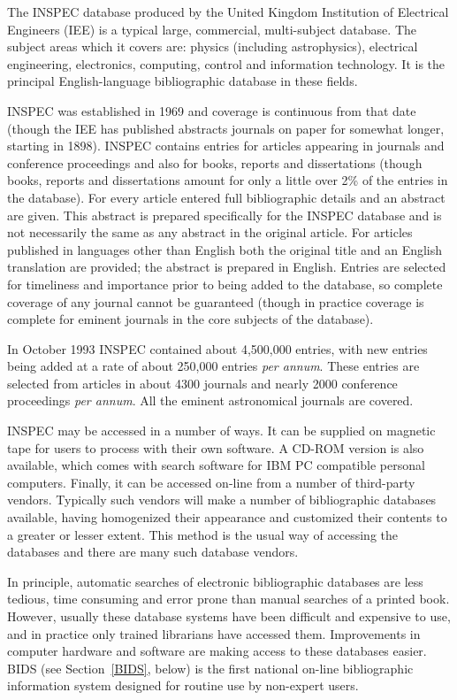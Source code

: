 \documentclass[twoside,11pt,nolof]{starlink}
\begin{document}
The INSPEC database produced by the United Kingdom Institution of
Electrical Engineers (IEE) is  a typical large, commercial,
multi-subject database. The subject areas which it covers are: physics
(including astrophysics), electrical engineering, electronics,
computing, control and information technology. It is the principal
English-language bibliographic database in these fields.

INSPEC was established in 1969 and coverage is continuous from that
date (though the IEE has published abstracts journals on paper for
somewhat longer, starting in 1898). INSPEC contains entries for articles
appearing in journals and conference proceedings and also for books,
reports and dissertations (though books, reports and dissertations
amount for only a little over 2\% of the entries in the database). For
every article entered full bibliographic details and an abstract are
given. This abstract is prepared specifically for the INSPEC database
and is not necessarily the same as any abstract in the original article.
For articles published in languages other than English both the original
title and an English translation are provided; the abstract is prepared
in English. Entries are selected for timeliness and importance prior to
being added to the database, so complete coverage of any journal
cannot be guaranteed (though in practice coverage is complete for
eminent journals in the core subjects of the database).

In October 1993 INSPEC contained about 4,500,000 entries, with new
entries being added at a rate of about 250,000 entries \textit{per annum}.
These entries are selected from articles in about 4300 journals and
nearly 2000 conference proceedings \textit{per annum}. All the eminent
astronomical journals are covered.

INSPEC may be accessed in a number of ways. It can be supplied on
magnetic tape for users to process with their own software. A CD-ROM
version is also available, which comes with search software for IBM PC
compatible personal computers. Finally, it can be accessed on-line from
a number of third-party vendors. Typically such vendors will make a
number of bibliographic databases available, having homogenized their
appearance and customized their contents to a greater or lesser extent.
This method is the usual way of accessing the databases and there are
many such database vendors.

In principle, automatic searches of electronic bibliographic databases
are less tedious, time consuming and error prone than manual searches of
a printed book. However, usually these database systems have been
difficult and expensive to use, and in practice only trained librarians
have accessed them. Improvements in computer hardware and software are
making access to these databases easier. BIDS (see Section~\ref{BIDS},
below) is the first national on-line bibliographic information system
designed for routine use by non-expert users.
\end{document}
